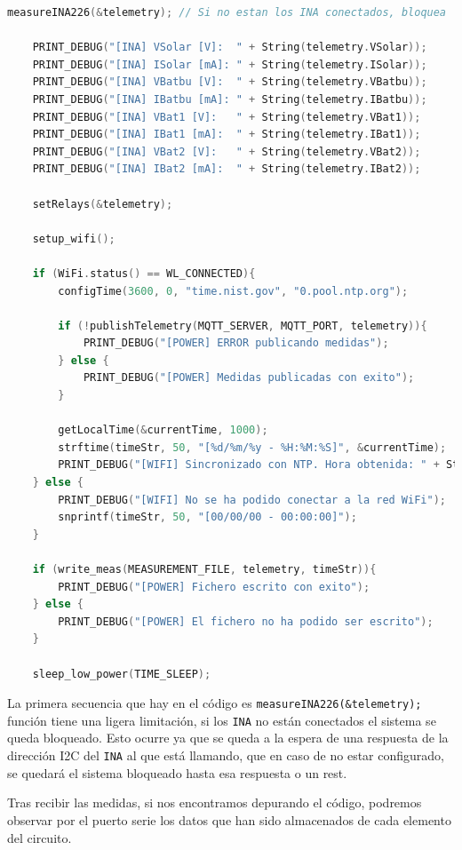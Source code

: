 \begin{lstlisting}[captionpos=b, caption={Codigo de la funcion loop}, language=c++]
    measureINA226(&telemetry); // Si no estan los INA conectados, bloquea

    PRINT_DEBUG("[INA] VSolar [V]:  " + String(telemetry.VSolar));
    PRINT_DEBUG("[INA] ISolar [mA]: " + String(telemetry.ISolar));
    PRINT_DEBUG("[INA] VBatbu [V]:  " + String(telemetry.VBatbu));
    PRINT_DEBUG("[INA] IBatbu [mA]: " + String(telemetry.IBatbu));
    PRINT_DEBUG("[INA] VBat1 [V]:   " + String(telemetry.VBat1));
    PRINT_DEBUG("[INA] IBat1 [mA]:  " + String(telemetry.IBat1));
    PRINT_DEBUG("[INA] VBat2 [V]:   " + String(telemetry.VBat2));
    PRINT_DEBUG("[INA] IBat2 [mA]:  " + String(telemetry.IBat2));

    setRelays(&telemetry);

    setup_wifi();

    if (WiFi.status() == WL_CONNECTED){
        configTime(3600, 0, "time.nist.gov", "0.pool.ntp.org");
        
        if (!publishTelemetry(MQTT_SERVER, MQTT_PORT, telemetry)){
            PRINT_DEBUG("[POWER] ERROR publicando medidas");
        } else {
            PRINT_DEBUG("[POWER] Medidas publicadas con exito");
        }

        getLocalTime(&currentTime, 1000);
        strftime(timeStr, 50, "[%d/%m/%y - %H:%M:%S]", &currentTime);
        PRINT_DEBUG("[WIFI] Sincronizado con NTP. Hora obtenida: " + String(timeStr));
    } else {
        PRINT_DEBUG("[WIFI] No se ha podido conectar a la red WiFi");
        snprintf(timeStr, 50, "[00/00/00 - 00:00:00]");
    }

    if (write_meas(MEASUREMENT_FILE, telemetry, timeStr)){
        PRINT_DEBUG("[POWER] Fichero escrito con exito");
    } else {
        PRINT_DEBUG("[POWER] El fichero no ha podido ser escrito");
    }

    sleep_low_power(TIME_SLEEP);
\end{lstlisting}

La primera secuencia que hay en el código es \texttt{measureINA226(\&telemetry);} función tiene una ligera limitación, si los \texttt{INA} no están conectados el sistema se queda bloqueado.
Esto ocurre ya que se queda a la espera de una respuesta de la dirección I2C del \texttt{INA} al que está llamando, que en caso de no estar configurado, se quedará el sistema bloqueado hasta esa respuesta o un rest.

Tras recibir las medidas, si nos encontramos depurando el código, podremos observar por el puerto serie los datos que han sido almacenados de cada elemento del circuito.

